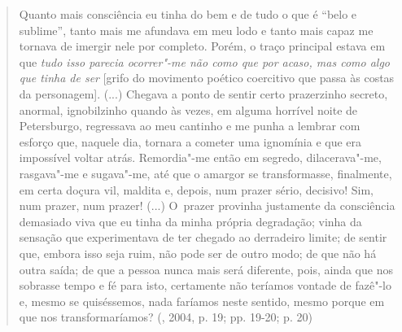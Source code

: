 {\begin{quote}
Quanto mais consciência eu tinha do bem e de tudo o que é ``belo e
sublime'', tanto mais me afundava em meu lodo e tanto mais capaz me
tornava de imergir nele por completo. Porém, o traço principal estava em
que \emph{tudo isso parecia ocorrer"-me não como que por acaso, mas como
algo que tinha de ser} {[}grifo do movimento poético coercitivo que
passa às costas da personagem{]}. (...) Chegava a ponto de sentir certo
prazerzinho secreto, anormal, ignobilzinho quando às vezes, em alguma
horrível noite de Petersburgo, regressava ao meu cantinho e me punha a
lembrar com esforço que, naquele dia, tornara a cometer uma ignomínia e
que era impossível voltar atrás. Remordia"-me então em segredo,
dilacerava"-me, rasgava"-me e sugava"-me, até que o amargor se
transformasse, finalmente, em certa doçura vil, maldita e, depois, num
prazer sério, decisivo! Sim, num prazer, num prazer! (...) O~prazer
provinha justamente da consciência demasiado viva que eu tinha da minha
própria degradação; vinha da sensação que experimentava de ter chegado
ao derradeiro limite; de sentir que, embora isso seja ruim, não pode ser
de outro modo; de que não há outra saída; de que a pessoa nunca mais
será diferente, pois, ainda que nos sobrasse tempo e fé para isto,
certamente não teríamos vontade de fazê"-lo e, mesmo se quiséssemos, nada
faríamos neste sentido, mesmo porque em que nos transformaríamos?
(, 2004, p. 19; pp. 19-20; p. 20)
\end{quote}

}
